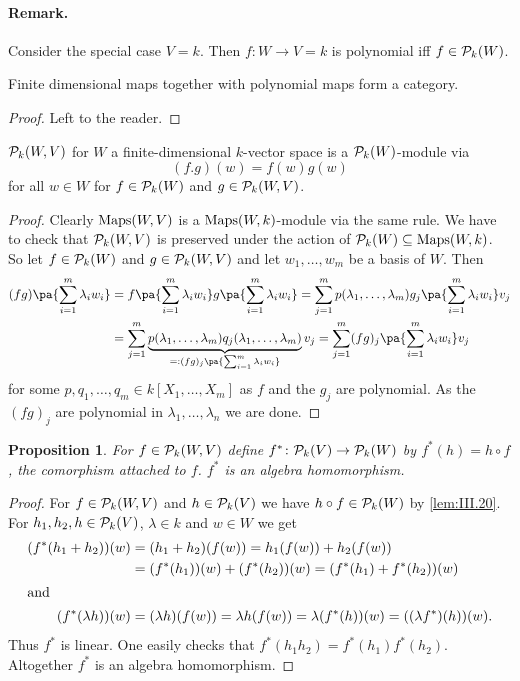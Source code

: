 \documentclass[12pt,a4paper]{scrartcl}
\theoremstyle{cplain}
\theoremstyle{cplain}
\theoremstyle{cplain}
\newtheorem{prop}[thmcounter]{Proposition}
\theoremstyle{definition}
\begin{document}
\begin{otherlanguage}{english}
\paragraph{Remark.}
Consider the special case $V=k$. Then $f\colon W \to V = k$ is polynomial iff $f \in \mathcal{P}_k(W)$.

\begin{lem} \label{lem:III.20}
  Finite dimensional maps together with polynomial maps form a category.
\end{lem}
\begin{proof}
  Left to the reader.
\end{proof}

\begin{lem}
  $\mathcal{P}_k(W,V)$ for $W$ a finite-dimensional $k$-vector space is a $\mathcal{P}_k(W)$-module via \[ (f.g)(w) = f(w)g(w)  \] for all $w \in W$ for $f\in \mathcal{P}_k(W) $ and $g\in \mathcal{P}_k(W,V)$.
\end{lem}
\begin{proof}
  Clearly $\operatorname{Maps}(W,V)$ is a $\operatorname{Maps}(W,k)$-module via the same rule. We have to check that $\mathcal{P}_k(W,V)$ is preserved under the action of $\mathcal{P}_k(W) \subseteq \operatorname{Maps}(W,k)$. So let $f \in \mathcal{P}_k(W)$ and $g\in\mathcal{P}_k(W,V)$ and let $w_1,\ldots,w_m$ be a basis of $W$. Then
  \begin{align*}
    (fg)\pa{\sum_{i=1}^m\lambda_iw_i} &= f\pa{\sum_{i=1}^m\lambda_iw_i}g\pa{\sum_{i=1}^m\lambda_iw_i} = \sum_{j=1}^m p(\lambda_1,\ldots,\lambda_m) g_j\pa{\sum_{i=1}^m\lambda_iw_i}v_j \\
    &= \sum_{j=1}^m\underbrace{p(\lambda_1,\ldots,\lambda_m)q_j(\lambda_1,\ldots,\lambda_m)}_{=: (fg)_j\pa{\sum_{i=1}^m\lambda_iw_i}}v_j = \sum_{j=1}^m (fg)_j\pa{\sum_{i=1}^m\lambda_iw_i} v_j
  \end{align*}
  for some $p,q_1,\ldots,q_m \in k[X_1,\ldots,X_m]$ as $f$ and the $g_j$ are polynomial. As the $(fg)_j$ are polynomial in $\lambda_1,\ldots,\lambda_n$ we are done.
\end{proof}

\begin{prop} \label{prop:III.22}
  For $f \in \mathcal{P}_k(W,V)$ define $f^*\colon \mathcal{P}_k(V) \to \mathcal{P}_k(W)$ by $f^*(h) = h \circ f$, the \emph{comorphism attached to $f$}. $f^*$ is an algebra homomorphism.
\end{prop}
\begin{proof}
  For $f\in \mathcal{P}_k(W,V)$ and $h\in \mathcal{P}_k(V)$ we have $h\circ f\in\mathcal{P}_k(W)$ by \cref{lem:III.20}. For $h_1,h_2,h \in  \mathcal{P}_k(V)$, $\lambda\in k$ and $w\in W$ we get
  \begin{align*}
    (f^*(h_1+h_2))(w) &= (h_1+h_2)(f(w)) = h_1(f(w)) + h_2(f(w)) \\
    &= (f^*(h_1))(w) + (f^*(h_2))(w) = (f^*(h_1) + f^*(h_2))(w) \\
    \intertext{and}
    (f^*(\lambda h))(w) &= (\lambda h)(f(w)) = \lambda h (f(w)) = \lambda (f^*(h))(w) = ((\lambda f^*)(h))(w).
  \end{align*}
  Thus $f^*$ is linear. One easily checks that $f^*(h_1h_2) = f^*(h_1)f^*(h_2)$. Altogether $f^*$ is an algebra homomorphism.
\end{proof}


\end{otherlanguage}
\end{document}
